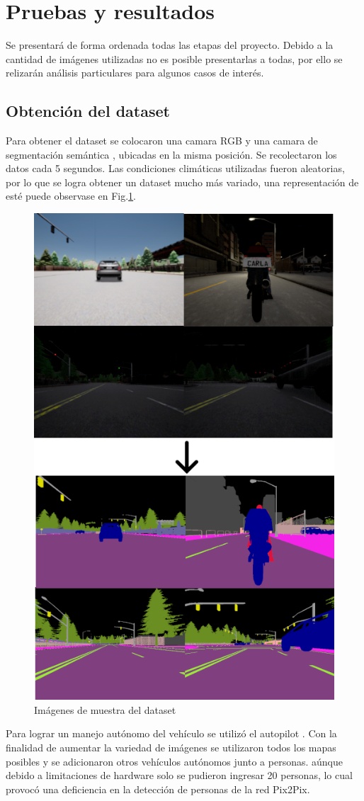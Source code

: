 \documentclass[]{IEEEtran}
\begin{document}
    \section{Pruebas y resultados}

    Se presentará de forma ordenada todas las etapas del proyecto. 
    Debido a la cantidad de imágenes utilizadas no es posible presentarlas a todas, por ello 
    se relizarán análisis particulares para algunos casos de interés.

    \subsection{Obtención del dataset}

    Para obtener el dataset se colocaron una camara RGB y una camara de segmentación semántica
    \cite{CARLA-Sensors-Reference}, ubicadas en la misma posición. Se recolectaron los datos 
    cada 5 segundos. Las condiciones climáticas utilizadas fueron aleatorias, por lo que se logra
    obtener un dataset mucho más variado, una representación de esté puede observase en 
    Fig.\ref{fig:dataset}.

    \begin{figure}
        \centering
        \includegraphics[width=.5\textwidth]{Imgs/Dataset.png}
        \caption{Imágenes de muestra del dataset}
        \label{fig:dataset}
    \end{figure}

    Para lograr un manejo autónomo del vehículo se utilizó el autopilot \cite{CARLA-Documentation}. 
    Con la finalidad de aumentar la variedad de imágenes se utilizaron todos los mapas posibles y 
    se adicionaron otros vehículos autónomos junto a personas. aúnque debido 
    a limitaciones de hardware solo se pudieron ingresar 20 personas, lo cual 
    provocó una deficiencia en la detección de personas de la red Pix2Pix. 
\end{document}
